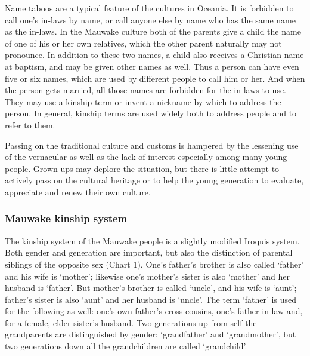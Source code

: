 Name taboos are a typical feature of the cultures in Oceania.  It is forbidden to call one's in-laws by name, or call anyone else by name who has the same name as the in-laws.  In the Mauwake culture both of the parents give a child the name of one of his or her own relatives, which the other parent naturally may not pronounce.  In addition to these two names, a child also receives a Christian name at baptism, and may be given other names as well.  Thus a person can have even five or six names, which are used by different people to call him or her.  And when the person gets married, all those names are forbidden for the in-laws to use.  They may use a kinship term or invent a nickname by which to address the person. In general, kinship terms are used widely both to address people and to refer to them.

Passing on the traditional culture and customs is hampered by the lessening use of the vernacular as well as the lack of interest especially among many young people. Grown-ups may deplore the situation, but there is little attempt to actively pass on the cultural heritage or to help the young generation to evaluate, appreciate and renew their own culture. 



\begin{figure}
\caption{ }
\label{ }
\end{figure}
 



\subsubsection{Mauwake kinship system} \label{sec:1.3.6:kinship}
The kinship system of the Mauwake people is a slightly modified Iroquis system. Both gender and generation are important, but also the distinction of parental siblings of the opposite sex (Chart 1). One's father's brother is also called  `father' and his wife is  `mother'; likewise one's mother's sister is also `mother' and her husband is `father'. But mother's brother is called  `uncle', and his wife is  `aunt'; father's sister is also `aunt' and her husband is `uncle'. The term `father' is used for the following as well: one's own father's cross-cousins, one's father-in law and, for a female, elder sister's husband. Two generations up from self the grandparents are distinguished by gender:  `grandfather' and  `grandmother', but two generations down all the grandchildren are called  `grandchild'. 

